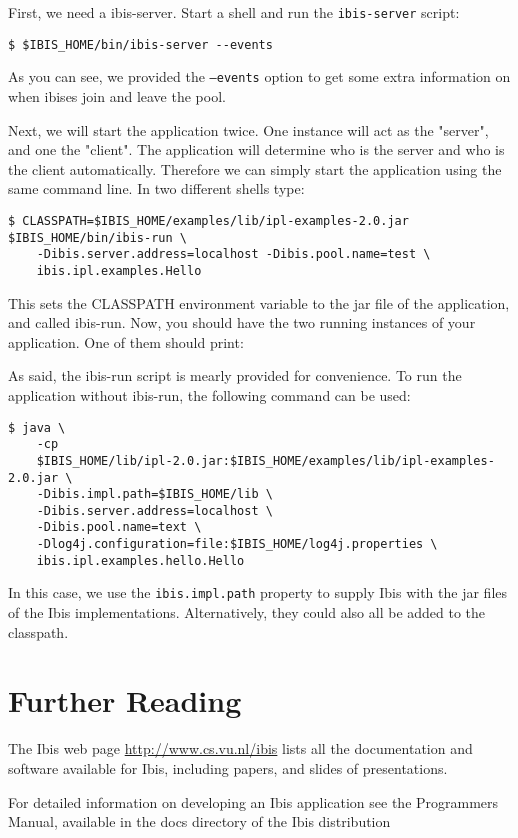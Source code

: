 \documentclass[10pt]{article}
\begin{document}
First, we need a ibis-server. Start a shell and
run the \texttt{ibis-server} script:
\noindent
{\small
\begin{verbatim}
$ $IBIS_HOME/bin/ibis-server --events
\end{verbatim}
}
\noindent

As you can see, we provided the \texttt{--events} option to get some
extra information on when ibises join and leave the pool.

Next, we will start the application twice. One instance will act as the
"server", and one the "client". The application will determine who is
the server and who is the client automatically. Therefore we can simply
start the application using the same command line. In two different
shells type:

\noindent
{\small
\begin{verbatim}
$ CLASSPATH=$IBIS_HOME/examples/lib/ipl-examples-2.0.jar $IBIS_HOME/bin/ibis-run \
    -Dibis.server.address=localhost -Dibis.pool.name=test \
    ibis.ipl.examples.Hello
\end{verbatim}
}
\noindent

This sets the CLASSPATH environment variable to the jar file of the
application, and called ibis-run. Now, you should have the two running
instances of your application. One of them should print:

 \noindent 

As said, the ibis-run script is mearly provided for convenience. To run
the application without ibis-run, the following command can be used:

\noindent
{\small
\begin{verbatim}
$ java \
    -cp
    $IBIS_HOME/lib/ipl-2.0.jar:$IBIS_HOME/examples/lib/ipl-examples-2.0.jar \
    -Dibis.impl.path=$IBIS_HOME/lib \
    -Dibis.server.address=localhost \
    -Dibis.pool.name=text \
    -Dlog4j.configuration=file:$IBIS_HOME/log4j.properties \
    ibis.ipl.examples.hello.Hello
\end{verbatim}
}
\noindent

In this case, we use the \texttt{ibis.impl.path} property to supply Ibis
with the jar files of the Ibis implementations. Alternatively, they
could also all be added to the classpath.

\section{Further Reading}

The Ibis web page \url{http://www.cs.vu.nl/ibis} lists all
the documentation and software available for Ibis, including papers, and
slides of presentations.

For detailed information on developing an Ibis application see the
Programmers Manual, available in the docs directory of the Ibis
distribution
\end{document}
